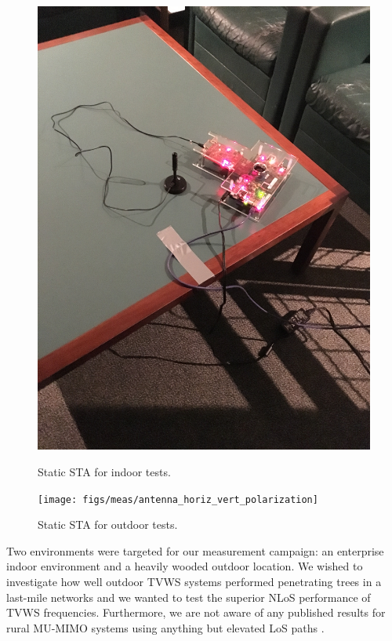 \begin{figure}[p]
\centering
\begin{minipage}{0.45\textwidth}
\centering
\includegraphics[width=1.0\linewidth]{figs/meas/example_single_node}
\caption{Static \ac{STA} for indoor tests.}
\label{fig_sta_indoor_table}
\end{minipage}
\hfill
\begin{minipage}{0.45\textwidth}
\centering
\texttt{[image: figs/meas/antenna\_horiz\_vert\_polarization]}
\caption{Static \ac{STA} for outdoor tests.}
\label{fig_sta_outdoor_tripod}
\end{minipage}
\end{figure}

\pagebreak

	Two environments were targeted for our measurement campaign: an enterprise indoor environment and a heavily wooded outdoor location.
	We wished to investigate how well outdoor \ac{TVWS} systems performed penetrating trees in a last-mile networks and we wanted to test the superior \ac{NLoS} performance of \ac{TVWS} frequencies.
	Furthermore, we are not aware of any published results for rural \ac{MU-MIMO} systems using anything but elevated \ac{LoS} paths \cite{collings2012ngara}.

